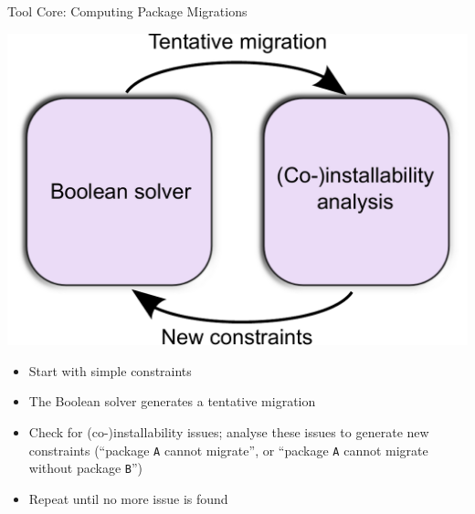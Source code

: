 \documentclass[xcolor={dvipsnames}]{beamer}
\begin{document}
\begin{frame}{Tool Core: Computing Package Migrations}

\vspace{-1em}
\begin{center}
\includegraphics[width=0.5\linewidth]{architecture}
\end{center}

\vspace{-1em}

\begin{itemize}
\item Start with simple constraints
\item The Boolean solver generates a tentative migration
\item 
 Check for (co-)installability issues;
  analyse these issues to generate new constraints
  (``package \texttt{A} cannot migrate'',
  or ``package \texttt{A} cannot migrate without package \texttt{B}'')
\item Repeat until no more issue is found
\end{itemize}
\end{frame}
\end{document}
